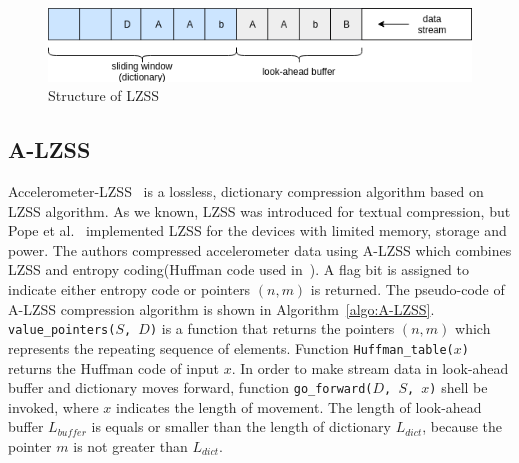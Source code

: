 \begin{figure}
    \centering
    \includegraphics{figures/LZSS.png}
    \caption{Structure of LZSS}
    \label{fig:LZSS}
\end{figure}

\subsection{A-LZSS}
Accelerometer-LZSS~\cite{pope2018accelerometer} is a lossless, dictionary
compression algorithm based on LZSS algorithm. As we known, LZSS was introduced
for textual compression, but Pope et al.~\cite{pope2018accelerometer}
implemented LZSS for the devices with limited memory, storage and power. The
authors compressed accelerometer data using A-LZSS which combines LZSS and
entropy coding(Huffman code used in~\cite{pope2018accelerometer}). A flag bit is
assigned to indicate either entropy code or pointers $(n, m)$ is returned. The
pseudo-code of A-LZSS compression algorithm is shown in
Algorithm~\ref{algo:A-LZSS}. \texttt{value\_pointers($S$, $D$)} is a function
that returns the pointers $(n, m)$ which represents the repeating sequence of
elements. Function \texttt{Huffman\_table($x$)} returns the Huffman code of
input $x$. In order to make stream data in look-ahead buffer and dictionary
moves forward, function \texttt{go\_forward($D$, $S$, $x$)} shell be invoked,
where $x$ indicates the length of movement. The length of look-ahead buffer
$L_{buffer}$ is equals or smaller than the length of dictionary $L_{dict}$,
because the pointer $m$ is not greater than $L_{dict}$. 

